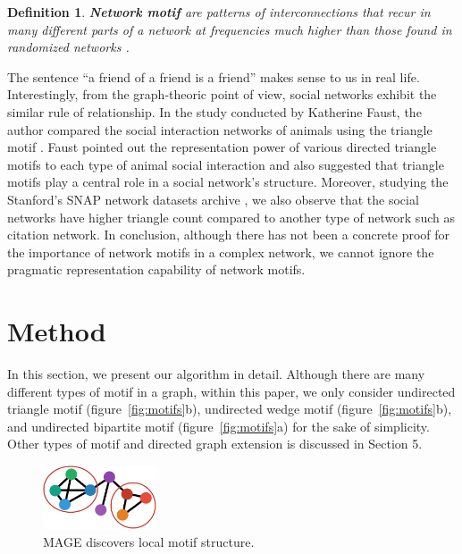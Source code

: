\documentclass[letterpaper]{article}
\newtheorem{ntdef}{Definition}
\begin{document}
            \begin{ntdef}
                \textbf{Network motif} are patterns of interconnections that recur in many different
                parts of a network at frequencies much higher than those found in randomized networks
                \cite{motifblockmilo}.
            \end{ntdef}

            The sentence ``a friend of a friend is a friend'' makes sense to us in real life. Interestingly,
            from the graph-theoric point of view, social networks exhibit the similar rule of relationship.
            In the study conducted by Katherine Faust, the author compared the social interaction 
            networks of animals using the triangle motif \cite{comsocialnetwork}. Faust pointed
            out the representation power of various directed triangle motifs to each type of animal social
            interaction and also suggested that triangle motifs play a central role in a social network's
            structure. Moreover, studying the Stanford's SNAP network datasets archive \cite{snap}, 
            we also observe that the social networks have higher triangle count compared to another type of 
            network such as citation network. In conclusion, although there has not been a concrete proof 
            for the importance of network motifs in a complex network, we cannot ignore the pragmatic 
            representation capability of network motifs.

    \section{Method}

        In this section, we present our algorithm in detail. Although there are many different types of motif
        in a graph, within this paper, we only consider undirected triangle motif (figure~\ref{fig:motifs}b),
        undirected wedge motif (figure~\ref{fig:motifs}b), and undirected bipartite motif 
        (figure~\ref{fig:motifs}a) for the sake of simplicity. Other types of motif and directed graph
        extension is discussed in Section 5.

        \begin{figure}
            \centering
            \includegraphics[width=0.3\textwidth]{fig5_mage}
            \caption{MAGE discovers local motif structure.}
            \label{fig:nv}
        \end{figure}
\end{document}
